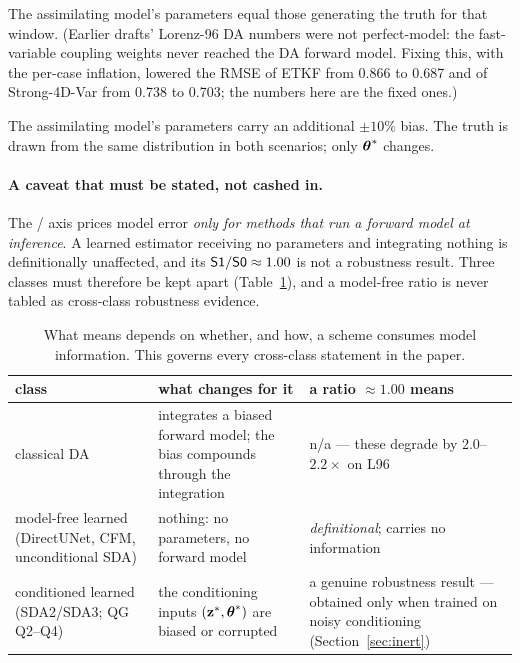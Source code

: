 \begin{description}[leftmargin=2em,style=nextline]
  \item[\Sz{} (perfect model).] The assimilating model's parameters equal those
    generating the truth for that window. (Earlier drafts' Lorenz-96 DA numbers
    were not perfect-model: the fast-variable coupling weights never reached the
    DA forward model. Fixing this, with the per-case inflation, lowered the \Sz{} RMSE of ETKF
    from 0.866 to 0.687 and of Strong-4D-Var from 0.738 to 0.703; the numbers here are the fixed
    ones.)
  \item[\So{} (model error).] The assimilating model's parameters carry an
    additional $\pm 10\%$ bias. The truth is drawn from the same distribution in
    both scenarios; only $\boldsymbol{\theta}^{*}$ changes.
\end{description}

\paragraph{A caveat that must be stated, not cashed in.}
The \Sz{}/\So{} axis prices model error \emph{only for methods that run a forward
model at inference}. A learned estimator receiving no parameters and integrating
nothing is definitionally unaffected, and its $\textsf{S1}/\textsf{S0} \approx 1.00$ is not a
robustness result. Three classes must therefore be kept apart
(Table~\ref{tab:classes}), and a model-free ratio is never tabled as cross-class
robustness evidence.

\begin{table}[t]
\centering
\small
\begin{tabular}{@{}p{}p{}p{}@{}}
\toprule
\textbf{class} & \textbf{what \So{} changes for it} & \textbf{a ratio $\approx 1.00$ means} \\
\midrule
classical DA & integrates a biased forward model; the bias compounds through the
integration & n/a --- these degrade by $2.0$--$2.2\times$ on L96 \\
model-free learned (DirectUNet, CFM, unconditional SDA) & nothing: no parameters,
no forward model & \emph{definitional}; carries no information \\
conditioned learned (SDA2/SDA3; QG Q2--Q4) & the conditioning inputs
$(\mathbf{z}^{*},\boldsymbol{\theta}^{*})$ are biased or corrupted & a genuine robustness result ---
obtained only when trained on noisy conditioning (Section~\ref{sec:inert}) \\
\bottomrule
\end{tabular}
\caption{What \So{} means depends on whether, and how, a scheme consumes model
information. This governs every cross-class statement in the paper.}
\label{tab:classes}
\end{table}

